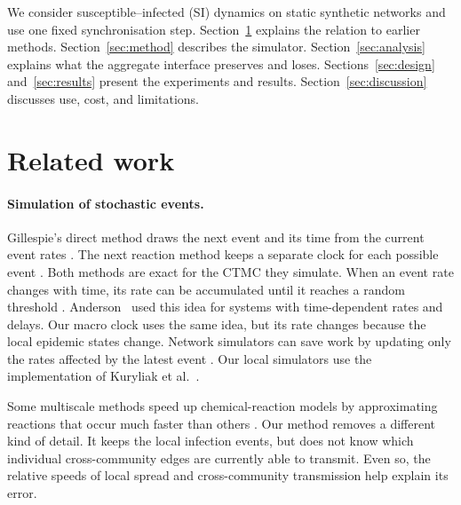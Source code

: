 \documentclass{ieeeaccess}
\begin{document}
We consider susceptible--infected (SI) dynamics on static synthetic networks and use one fixed synchronisation step. Section~\ref{sec:related} explains the relation to earlier methods. Section~\ref{sec:method} describes the simulator. Section~\ref{sec:analysis} explains what the aggregate interface preserves and loses. Sections~\ref{sec:design} and~\ref{sec:results} present the experiments and results. Section~\ref{sec:discussion} discusses use, cost, and limitations.

\section{Related work}
\label{sec:related}

\paragraph{Simulation of stochastic events.}
Gillespie's direct method draws the next event and its time from the current event rates \cite{gillespie1977exact}. The next reaction method keeps a separate clock for each possible event \cite{gibson2000}. Both methods are exact for the CTMC they simulate. When an event rate changes with time, its rate can be accumulated until it reaches a random threshold \cite{ethier1986}. Anderson~\cite{anderson2007} used this idea for systems with time-dependent rates and delays. Our macro clock uses the same idea, but its rate changes because the local epidemic states change. Network simulators can save work by updating only the rates affected by the latest event \cite{vestergaard2015,kuryliak2025simulating}. Our local simulators use the implementation of Kuryliak et al.~\cite{kuryliak2025simulating}.

Some multiscale methods speed up chemical-reaction models by approximating reactions that occur much faster than others \cite{haseltine2002,cao2005slow}. Our method removes a different kind of detail. It keeps the local infection events, but does not know which individual cross-community edges are currently able to transmit. Even so, the relative speeds of local spread and cross-community transmission help explain its error.
\end{document}
